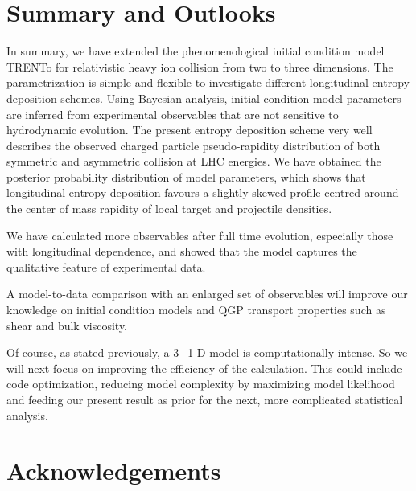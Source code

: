 \documentclass[aps,prl,twocolumn,groupedaddress]{revtex4-1}
\begin{document}
\section{Summary and Outlooks}
	In summary, we have extended the phenomenological initial condition model TRENTo for relativistic heavy ion collision from two to three dimensions. 	
	The parametrization is simple and flexible to investigate different longitudinal entropy deposition schemes. 	
	Using Bayesian analysis, initial condition model parameters are inferred from experimental observables that are not sensitive to hydrodynamic evolution. 	
	The present entropy deposition scheme very well describes the observed charged particle pseudo-rapidity distribution of both symmetric and asymmetric collision at LHC energies.
	We have obtained the posterior probability distribution of model parameters, which shows that longitudinal entropy deposition favours a slightly skewed profile centred around the center of mass rapidity of local target and projectile densities.

	We have calculated more observables after full time evolution, especially those with longitudinal dependence, and showed that the model captures the qualitative feature of experimental data.

	A model-to-data comparison with an enlarged set of observables will improve our knowledge on initial condition models and QGP transport properties such as shear and bulk viscosity. 

	Of course, as stated previously, a 3+1 D model is computationally intense. So we will next focus on improving the efficiency of the calculation. This could include code optimization, reducing model complexity by maximizing model likelihood and feeding our present result as prior for the next, more complicated statistical analysis.

\section{Acknowledgements}


%
\end{document}
